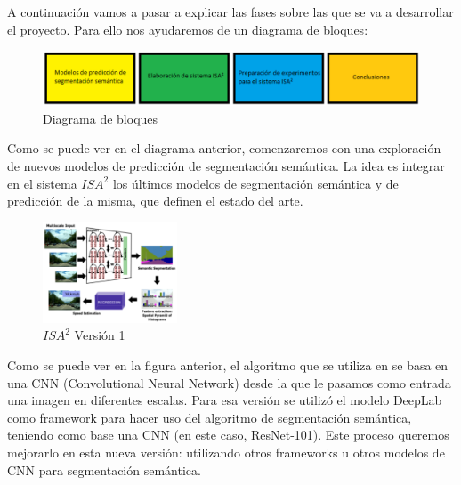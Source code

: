 \documentclass[12pt,oneside,a4paper]{article}
\begin{document}
A continuación vamos a pasar a explicar las fases sobre las que se va a desarrollar el proyecto. Para ello nos ayudaremos de un diagrama de bloques:

\begin{figure}[h]
  \centering
  \includegraphics[width=16cm]{figuras/Diagrama_Bloques.eps}
  \caption{Diagrama de bloques}
\end{figure}

Como se puede ver en el diagrama anterior, comenzaremos con una exploración de nuevos modelos de predicción de segmentación semántica. La idea es integrar en el sistema $ISA^2$ los últimos modelos de segmentación semántica y de predicción de la misma, que definen el estado del arte. 

\begin{figure}[H]
  \centering
  \includegraphics[width=4cm]{figuras/Figura_Esquema_ISA2_Version_1_SegSem.eps}
  \caption{$ISA^2$ Versión 1}
\end{figure}

Como se puede ver en la figura anterior, el algoritmo que se utiliza en \cite{isa2} se basa en una CNN (Convolutional Neural Network) desde la que le pasamos como entrada una imagen en diferentes escalas. Para esa versión se utilizó el modelo DeepLab \cite{deeplab} como framework para hacer uso del algoritmo de segmentación semántica, teniendo como base una CNN (en este caso, ResNet-101). Este proceso queremos mejorarlo en esta nueva versión: utilizando otros frameworks u otros modelos de CNN para segmentación semántica. 
\end{document}
